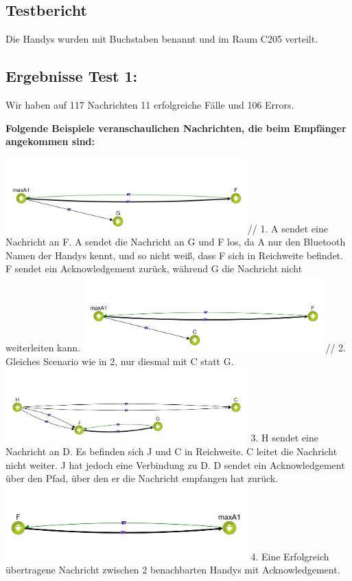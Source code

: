 \clearpage\subsection{Testbericht}\label{testbericht}

Die Handys wurden mit Buchstaben benannt und im Raum C205 verteilt.

\clearpage\subsection{Ergebnisse Test 1:}\label{ergebnisse-test-1}

Wir haben auf 117 Nachrichten 11 erfolgreiche Fälle und 106 Errors.

\textbf{Folgende Beispiele veranschaulichen Nachrichten, die beim
Empfänger angekommen sind:}

\includegraphics[width=0.7\textwidth]{belege/grosstests/Bilder/Erfolg4.jpg}// 
1. A sendet eine Nachricht an F. A sendet die Nachricht an G und F los, da A nur den
Bluetooth Namen der Handys kennt, und so nicht weiß, dass F sich in
Reichweite befindet. F sendet ein Acknowledgement zurück, während G die
Nachricht nicht weiterleiten kann.
\includegraphics[width=0.7\textwidth]{belege/grosstests/Bilder/Erfolg3.jpg}//
2. Gleiches Scenario wie in 2, nur diesmal mit C statt G.
\includegraphics[width=0.7\textwidth]{belege/grosstests/Bilder/Erfolg2.jpg} 3. H sendet eine
Nachricht an D. Es befinden sich J und C in Reichweite. C leitet die
Nachricht nicht weiter. J hat jedoch eine Verbindung zu D. D sendet ein
Acknowledgement über den Pfad, über den er die Nachricht empfangen hat
zurück. \includegraphics[width=0.7\textwidth]{belege/grosstests/Bilder/Erfolg1.jpg} 4. Eine
Erfolgreich übertragene Nachricht zwischen 2 benachbarten Handys mit
Acknowledgement.

